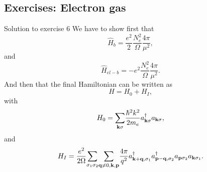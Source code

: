 \documentclass[%
twoside,                 %
final,                   %
10pt]{article}
\begin{document}
\subsection{Exercises: Electron gas}
\begin{block}{Solution to exercise 6 }
We have to show first  that
\[
\hat{H}_{b}=\frac{e^2}{2}\frac{N_e^2}{\Omega}\frac{4\pi}{\mu^2},
\]
and
\[
\hat{H}_{el-b}=-e^2\frac{N_e^2}{\Omega}\frac{4\pi}{\mu^2}.
\]
And then that the final Hamiltonian can be written as 
\[
H=H_{0}+H_{I},
\]
with
\[
H_{0}={\displaystyle\sum_{{\bf k}\sigma}}
\frac{\hbar^{2}k^{2}}{2m_e}a_{{\bf k}\sigma}^{\dagger}
a_{{\bf k}\sigma},
\]
and
\[
H_{I}=\frac{e^{2}}{2\Omega}{\displaystyle\sum_{\sigma_{1}
\sigma_{2}}}{\displaystyle
\sum_{{\bf q}\neq 0,{\bf k},{\bf p}}}\frac{4\pi}{q^{2}}
a_{{\bf k}+{\bf q},\sigma_{1}}^{\dagger}
a_{{\bf p}-{\bf q},\sigma_{2}}^{\dagger}
a_{{\bf p}\sigma_{2}}a_{{\bf k}\sigma_{1}}.
\] 

\end{block}

\end{document}

